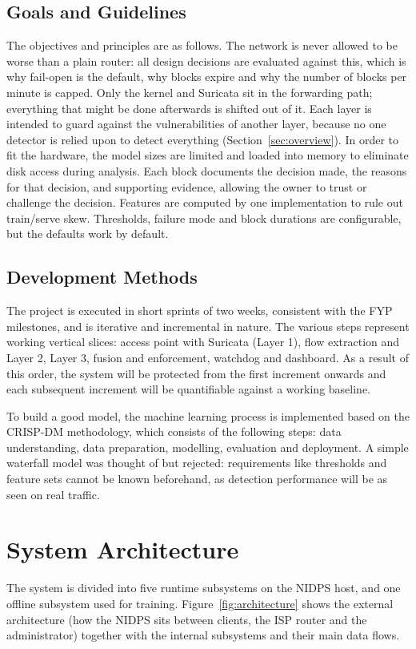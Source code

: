 \subsection{Goals and Guidelines}\label{sec:6.2.3}
\label{sec:goals}
\noindent The objectives and principles are as follows. The network is never allowed to be worse than a plain router: all design decisions are evaluated against this, which is why fail-open is the default, why blocks expire and why the number of blocks per minute is capped. Only the kernel and Suricata sit in the forwarding path; everything that might be done afterwards is shifted out of it. Each layer is intended to guard against the vulnerabilities of another layer, because no one detector is relied upon to detect everything (Section~\ref{sec:overview}). In order to fit the hardware, the model sizes are limited and loaded into memory to eliminate disk access during analysis. Each block documents the decision made, the reasons for that decision, and supporting evidence, allowing the owner to trust or challenge the decision. Features are computed by one implementation to rule out train/serve skew. Thresholds, failure mode and block durations are configurable, but the defaults work by default.

\subsection{Development Methods}\label{sec:6.2.4}
\label{sec:devmethods}
\noindent The project is executed in short sprints of two weeks, consistent with the FYP milestones, and is iterative and incremental in nature. The various steps represent working vertical slices: access point with Suricata (Layer 1), flow extraction and Layer 2, Layer 3, fusion and enforcement, watchdog and dashboard. As a result of this order, the system will be protected from the first increment onwards and each subsequent increment will be quantifiable against a working baseline.

\noindent To build a good model, the machine learning process is implemented based on the CRISP-DM methodology, which consists of the following steps: data understanding, data preparation, modelling, evaluation and deployment. A simple waterfall model was thought of but rejected: requirements like thresholds and feature sets cannot be known beforehand, as detection performance will be as seen on real traffic.

\section{System Architecture}\label{sec:6.3}
\label{sec:sysarch}
\noindent The system is divided into five runtime subsystems on the NIDPS host, and one offline subsystem used for training. Figure~\ref{fig:architecture} shows the external architecture (how the NIDPS sits between clients, the ISP router and the administrator) together with the internal subsystems and their main data flows.

